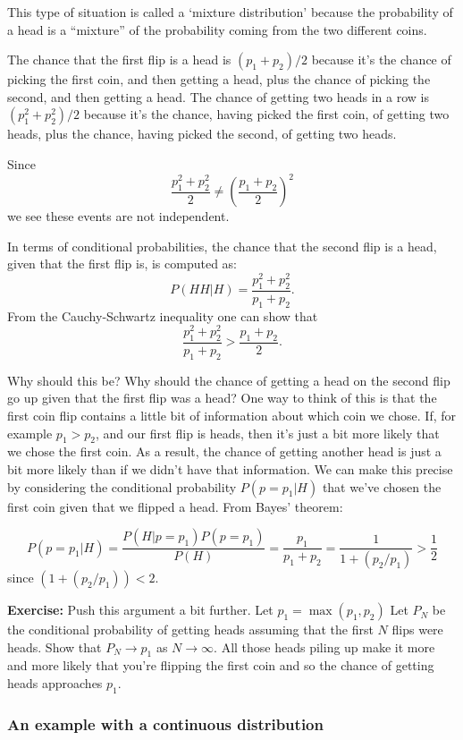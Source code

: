 \documentclass[
  11pt,
  letterpaper,
]{scrbook}
\theoremstyle{plain}
\theoremstyle{plain}
\theoremstyle{remark}
\begin{document}
This type of situation is called a `mixture distribution' because the
probability of a head is a ``mixture'' of the probability coming from
the two different coins.

The chance that the first flip is a head is \((p_1+p_2)/2\) because it's
the chance of picking the first coin, and then getting a head, plus the
chance of picking the second, and then getting a head. The chance of
getting two heads in a row is \((p_1^2+p_2^2)/2\) because it's the
chance, having picked the first coin, of getting two heads, plus the
chance, having picked the second, of getting two heads.

Since \[
\frac{p_1^2+p_2^2}{2}\not=\left(\frac{p_1+p_2}{2}\right)^2
\] we see these events are not independent.

In terms of conditional probabilities, the chance that the second flip
is a head, given that the first flip is, is computed as: \[
P(HH|H) = \frac{p_1^2+p_2^2}{p_1+p_2}.
\] From the Cauchy-Schwartz inequality one can show that \[
\frac{p_1^2+p_2^2}{p_1+p_2}>\frac{p_1+p_2}{2}.
\]

Why should this be? Why should the chance of getting a head on the
second flip go up given that the first flip was a head? One way to think
of this is that the first coin flip contains a little bit of information
about which coin we chose. If, for example \(p_1>p_2\), and our first
flip is heads, then it's just a bit more likely that we chose the first
coin. As a result, the chance of getting another head is just a bit more
likely than if we didn't have that information. We can make this precise
by considering the conditional probability \(P(p=p_1|H)\) that we've
chosen the first coin given that we flipped a head. From Bayes' theorem:

\[
P(p=p_1|H) = \frac{P(H|p=p_1)P(p=p_1)}{P(H)}=\frac{p_1}{p_1+p_2}=\frac{1}{1+(p_2/p_1)}>\frac{1}{2}
\] since \((1+(p_2/p_1))<2\).

\textbf{Exercise:} Push this argument a bit further. Let
\(p_1=\max(p_1,p_2)\) Let \(P_N\) be the conditional probability of
getting heads assuming that the first \(N\) flips were heads. Show that
\(P_N\to p_1\) as \(N\to\infty\). All those heads piling up make it more
and more likely that you're flipping the first coin and so the chance of
getting heads approaches \(p_1\).

\hypertarget{an-example-with-a-continuous-distribution}{%
\subsubsection{An example with a continuous
distribution}\label{an-example-with-a-continuous-distribution}}
\end{document}
